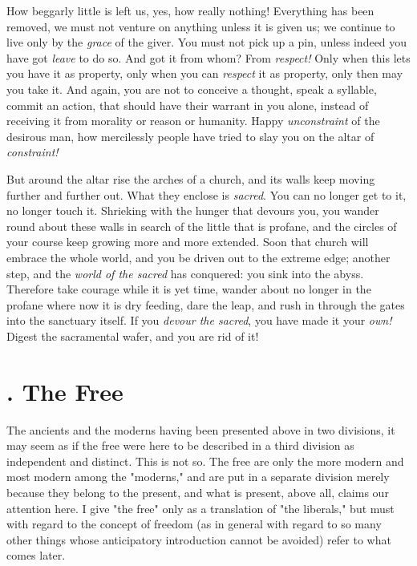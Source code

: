 \documentclass[a4paper]{book}
\begin{document}
How beggarly little is left us, yes, how really nothing! Everything has been 
removed, we must not venture on anything unless it is given us; we continue to 
live only by the \textit{grace} of the giver. You must not pick up a pin, 
unless indeed you have got \textit{leave} to do so. And got it from whom? From 
\textit{respect!} Only when this lets you have it as property, only when you 
can \textit{respect} it as property, only then may you take it. And again, you 
are not to conceive a thought, speak a syllable, commit an action, that should 
have their warrant in you alone, instead of receiving it from morality or 
reason or humanity. Happy \textit{unconstraint} of the desirous man, how 
mercilessly people have tried to slay you on the altar of \textit{constraint!}

But around the altar rise the arches of a church, and its walls keep moving 
further and further out. What they enclose is \textit{sacred}. You can no 
longer get to it, no longer touch it. Shrieking with the hunger that devours 
you, you wander round about these walls in search of the little that is 
profane, and the circles of your course keep growing more and more extended. 
Soon that church will embrace the whole world, and you be driven out to the 
extreme edge; another step, and the \textit{world of the sacred} has 
conquered: you sink into the abyss. Therefore take courage while it is yet 
time, wander about no longer in the profane where now it is dry feeding, dare 
the leap, and rush in through the gates into the sanctuary itself. If you 
\textit{devour the sacred}, you have made it your \textit{own!} Digest the 
sacramental wafer, and you are rid of it!

\section[3. The Free]{. The Free}

The ancients and the moderns having been presented above in two divisions, it 
may seem as if the free were here to be described in a third division as 
independent and distinct. This is not so. The free are only the more modern 
and most modern among the "{}moderns,"{} and are put in a separate division 
merely because they belong to the present, and what is present, above all, 
claims our attention here. I give "{}the free"{} only as a translation of 
"{}the liberals,"{} but must with regard to the concept of freedom (as in 
general with regard to so many other things whose anticipatory introduction 
cannot be avoided) refer to what comes later.
\end{document}

